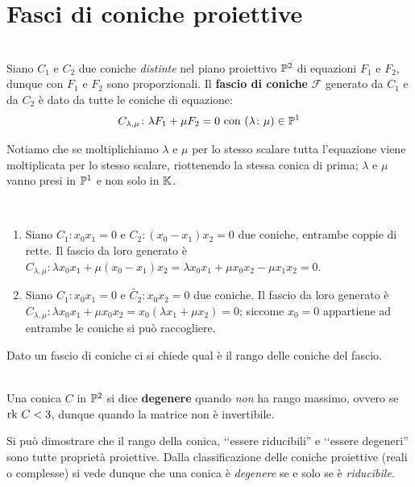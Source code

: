 \section{Fasci di coniche proiettive}
\begin{define}~{}\\
Siano $C_1$ e $C_2$ due coniche \textit{distinte} nel piano proiettivo $\proj[2]{\ }$ di equazioni $F_1$ e $F_2$, dunque con $F_1$ e $F_2$ sono proporzionali. Il \textbf{fascio di coniche} $\mathcal{F}$ generato da $C_1$ e da $C_2$ è dato da tutte le coniche di equazione:
\begin{equation}
	C_{\lambda,\mu}\colon \lambda F_1+\mu F_2=0\text{ con }(\lambda\colon \mu)\in \proj[1]{\ }
\end{equation}
\vspace{-6mm}
\end{define}
Notiamo che se moltiplichiamo $\lambda$ e $\mu$ per lo stesso scalare tutta l'equazione viene moltiplicata per lo stesso scalare, riottenendo la stessa conica di prima; $\lambda$ e $\mu$ vanno presi in $\proj[1]{\ }$ e non solo in $\mathbb{K}$.
\begin{examples}~{}
	\begin{enumerate}
		\item	Siano $C_1\colon x_0x_1=0$ e $C_2\colon (x_0-x_1)x_2=0$ due coniche, entrambe coppie di rette. Il fascio da loro generato è $C_{\lambda,\mu}\colon \lambda x_0x_1 + \mu (x_0-x_1)x_2=\lambda x_0x_1 + \mu x_0x_2 -\mu x_1x_2=0$.
		\item	Siano $C_1\colon x_0x_1=0$ e $\widetilde{C_2}\colon x_0x_2=0$ due coniche. Il fascio da loro generato è $C_{\lambda,\mu}\colon \lambda x_0x_1 +\mu x_0x_2=x_0(\lambda x_1 + \mu x_2)=0$; siccome $x_0=0$ appartiene ad entrambe le coniche si può raccogliere.
	\end{enumerate}
\vspace{-3mm}
\end{examples}
Dato un fascio di coniche ci si chiede qual è il rango delle coniche del fascio.
\begin{define}~{}\\
Una conica $C$ in $\proj[2]{\ }$ si dice \textbf{degenere} quando \textit{non} ha rango massimo, ovvero se $\mathrm{rk}\  C< 3$, dunque quando la matrice non è invertibile.
\end{define}
\begin{digression}
	 Si può dimostrare che il rango della conica,  ‘‘essere riducibili'' e ‘‘essere degeneri'' sono tutte proprietà proiettive. Dalla classificazione delle coniche proiettive (reali o complesse) si vede dunque che una conica è \textit{degenere} se e solo se è \textit{riducibile}.
\end{digression}
